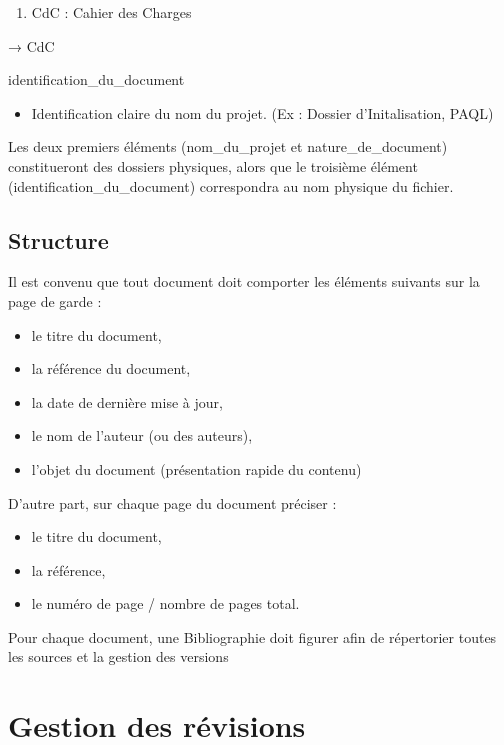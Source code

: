 \documentclass{mise_en_page}
\begin{document}
\begin{enumerate}
\item CdC :  Cahier des Charges
\end{enumerate}
→ CdC




identification\_du\_document

\begin{itemize}
\item Identification claire du nom du projet. (Ex : Dossier
d’Initalisation, PAQL)
\end{itemize}



Les deux premiers éléments (nom\_du\_projet et nature\_de\_document)
constitueront des dossiers physiques, alors que le troisième élément
(identification\_du\_document) correspondra au nom physique du fichier.




\subsection{Structure}
Il est convenu que tout document doit comporter les éléments suivants
sur la page de garde :

\begin{itemize}
\item le titre du document,
\item la référence du document,
\item la date de dernière mise à jour,
\item le nom de l’auteur (ou des auteurs),
\item l’objet du document (présentation rapide du contenu)
\end{itemize}



D’autre part, sur chaque page du document préciser :

\begin{itemize}
\item le titre du document,
\item la référence,
\item le numéro de page / nombre de pages total.
\end{itemize}



Pour chaque document, une Bibliographie doit figurer afin de répertorier
toutes les sources et la gestion des versions

\section{Gestion des révisions}
\end{document}
